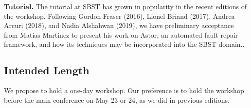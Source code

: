 \documentclass[10pt,conference]{IEEEtran}
\begin{document}
{\bf Tutorial.} The tutorial at SBST has grown in popularity in the
recent editions of the workshop. Following Gordon Fraser (2016),
Lionel Briand (2017), Andrea Arcuri (2018), and Nadia Alshahwan (2019), 
we have preliminary acceptance from Matías Martínez to present his work on 
Astor, an automated fault repair framework, and how its techniques may be incorporated
into the SBST domain..



\subsection{Intended Length} We propose to hold a one-day workshop. 
Our preference is to hold the workshop before the main
conference on May 23 or 24, as we did in previous editions.
\end{document}
